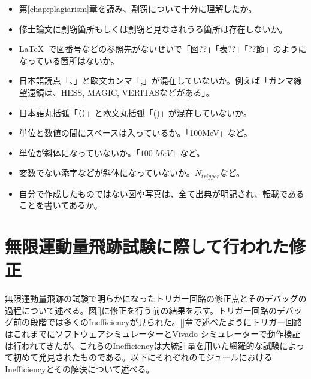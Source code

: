 \begin{itemize}
\item[\CID{00728}] 第\ref{chap:plagiarism}章を読み、剽窃について十分に理解したか。
\item[\CID{00728}] 修士論文に剽窃箇所もしくは剽窃と見なされうる箇所は存在しないか。
\item[\CID{00728}] \LaTeX\ で図番号などの参照先がないせいで「図??」「表??」「??節」のようになっている箇所はないか。
\item[\CID{00728}] 日本語読点「、」と欧文カンマ「,」が混在していないか。例えば「ガンマ線望遠鏡は、HESS, MAGIC, VERITASなどがある」。
\item[\CID{00728}] 日本語丸括弧「（）」と欧文丸括弧「()」が混在していないか。
\item[\CID{00728}] 単位と数値の間にスペースは入っているか。「100MeV」など。
\item[\CID{00728}] 単位が斜体になっていないか。「$100~MeV$」など。
\item[\CID{00728}] 変数でない添字などが斜体になっていないか。$N_{trigger}$など。
\item[\CID{00728}] 自分で作成したものではない図や写真は、全て出典が明記され、転載であることを書いてあるか。
\end{itemize}

\section{無限運動量飛跡試験に際して行われた修正}
\label{sec:appendix:infinite-momentum-tracks}
無限運動量飛跡の試験で明らかになったトリガー回路の修正点とそのデバッグの過程について述べる。図\ref{}に修正を行う前の結果を示す。トリガー回路のデバッグ前の段階では多くのInefficiencyが見られた。\ref{}章で述べたようにトリガー回路はこれまでにソフトウェアシミュレーターとVivado シミュレーターで動作検証は行われてきたが、これらのInefficiencyは大統計量を用いた網羅的な試験によって初めて発見されたものである。以下にそれぞれのモジュールにおけるInefficiencyとその解決について述べる。

